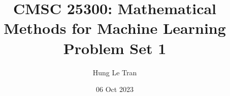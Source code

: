 \documentclass[a4paper, 10pt]{article}
\title{CMSC 25300: Mathematical Methods for Machine Learning \\ \large Problem Set 1}
\date{06 Oct 2023}
\author{Hung Le Tran}
\begin{document}
\maketitle
\setcounter{section}{1}
\begin{problem} [Problem 1]
\end{problem}
\begin{solution}
\end{solution}
\end{document}
